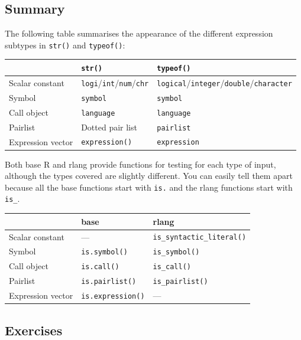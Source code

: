 \documentclass[]{book}
\begin{document}
\hypertarget{summary}{%
\subsection{Summary}\label{summary}}

The following table summarises the appearance of the different expression subtypes in \texttt{str()} and \texttt{typeof()}:

\begin{longtable}[]{@{}lll@{}}
\toprule
& \texttt{str()} & \texttt{typeof()}\tabularnewline
\midrule
\endhead
Scalar constant & \texttt{logi}/\texttt{int}/\texttt{num}/\texttt{chr} & \texttt{logical}/\texttt{integer}/\texttt{double}/\texttt{character}\tabularnewline
Symbol & \texttt{symbol} & \texttt{symbol}\tabularnewline
Call object & \texttt{language} & \texttt{language}\tabularnewline
Pairlist & Dotted pair list & \texttt{pairlist}\tabularnewline
Expression vector & \texttt{expression()} & \texttt{expression}\tabularnewline
\bottomrule
\end{longtable}

Both base R and rlang provide functions for testing for each type of input, although the types covered are slightly different. You can easily tell them apart because all the base functions start with \texttt{is.} and the rlang functions start with \texttt{is\_}.

\begin{longtable}[]{@{}lll@{}}
\toprule
& base & rlang\tabularnewline
\midrule
\endhead
Scalar constant & --- & \texttt{is\_syntactic\_literal()}\tabularnewline
Symbol & \texttt{is.symbol()} & \texttt{is\_symbol()}\tabularnewline
Call object & \texttt{is.call()} & \texttt{is\_call()}\tabularnewline
Pairlist & \texttt{is.pairlist()} & \texttt{is\_pairlist()}\tabularnewline
Expression vector & \texttt{is.expression()} & ---\tabularnewline
\bottomrule
\end{longtable}

\hypertarget{exercises-1}{%
\subsection{Exercises}\label{exercises-1}}
\end{document}
